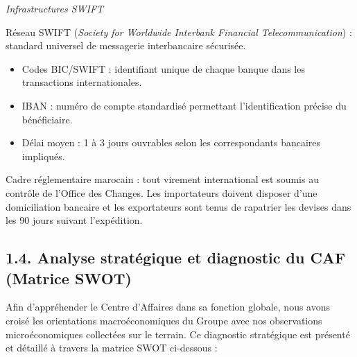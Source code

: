 \medskip\textit{Infrastructures SWIFT}

Réseau SWIFT (\textit{Society for Worldwide Interbank Financial Telecommunication}) : standard universel de messagerie interbancaire sécurisée.
\begin{itemize}
  \item Codes BIC/SWIFT : identifiant unique de chaque banque dans les transactions internationales.
  \item IBAN : numéro de compte standardisé permettant l'identification précise du bénéficiaire.
  \item Délai moyen : 1 à 3 jours ouvrables selon les correspondants bancaires impliqués.
\end{itemize}

Cadre réglementaire marocain : tout virement international est soumis au contrôle de l'Office des Changes. Les importateurs doivent disposer d'une domiciliation bancaire et les exportateurs sont tenus de rapatrier les devises dans les 90 jours suivant l'expédition.

\subsection*{1.4. Analyse stratégique et diagnostic du CAF (Matrice SWOT)}

Afin d'appréhender le Centre d'Affaires dans sa fonction globale, nous avons croisé les orientations macroéconomiques du Groupe avec nos observations microéconomiques collectées sur le terrain. Ce diagnostic stratégique est présenté et détaillé à travers la matrice SWOT ci-dessous :

